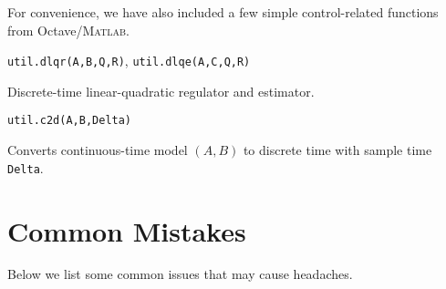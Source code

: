 \documentclass{article}
\newcommand{\funcname}[2][.25em]{\vspace{#1}\noindent\texttt{#2}\nopagebreak\vspace{#1}}
\begin{document}
\begin{multicols}{2}
For convenience, we have also included a few simple control-related functions from Octave/\textsc{Matlab}.

\funcname{util.dlqr(A,B,Q,R)}, \funcname[0pt]{util.dlqe(A,C,Q,R)}

Discrete-time linear-quadratic regulator and estimator.

\funcname{util.c2d(A,B,Delta)}

Converts continuous-time model $(A,B)$ to discrete time with sample time \texttt{Delta}.

\end{multicols}

\section{Common Mistakes}

Below we list some common issues that may cause headaches.
\end{document}
